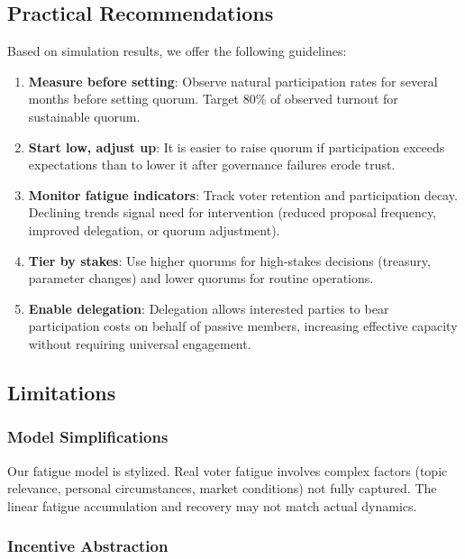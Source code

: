 \subsection{Practical Recommendations}

Based on simulation results, we offer the following guidelines:

\begin{enumerate}
    \item \textbf{Measure before setting}: Observe natural participation rates for several months before setting quorum. Target 80\% of observed turnout for sustainable quorum.

    \item \textbf{Start low, adjust up}: It is easier to raise quorum if participation exceeds expectations than to lower it after governance failures erode trust.

    \item \textbf{Monitor fatigue indicators}: Track voter retention and participation decay. Declining trends signal need for intervention (reduced proposal frequency, improved delegation, or quorum adjustment).

    \item \textbf{Tier by stakes}: Use higher quorums for high-stakes decisions (treasury, parameter changes) and lower quorums for routine operations.

    \item \textbf{Enable delegation}: Delegation allows interested parties to bear participation costs on behalf of passive members, increasing effective capacity without requiring universal engagement.
\end{enumerate}

\subsection{Limitations}

\subsubsection{Model Simplifications}

Our fatigue model is stylized. Real voter fatigue involves complex factors (topic relevance, personal circumstances, market conditions) not fully captured. The linear fatigue accumulation and recovery may not match actual dynamics.

\subsubsection{Incentive Abstraction}

